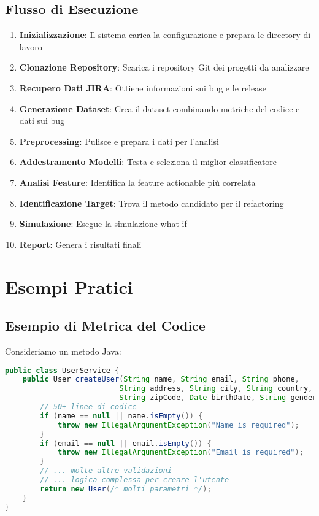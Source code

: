 \documentclass[12pt,a4paper]{article}
\begin{document}
\subsection{Flusso di Esecuzione}

\begin{enumerate}
    \item \textbf{Inizializzazione}: Il sistema carica la configurazione e prepara le directory di lavoro
    \item \textbf{Clonazione Repository}: Scarica i repository Git dei progetti da analizzare
    \item \textbf{Recupero Dati JIRA}: Ottiene informazioni sui bug e le release
    \item \textbf{Generazione Dataset}: Crea il dataset combinando metriche del codice e dati sui bug
    \item \textbf{Preprocessing}: Pulisce e prepara i dati per l'analisi
    \item \textbf{Addestramento Modelli}: Testa e seleziona il miglior classificatore
    \item \textbf{Analisi Feature}: Identifica la feature actionable più correlata
    \item \textbf{Identificazione Target}: Trova il metodo candidato per il refactoring
    \item \textbf{Simulazione}: Esegue la simulazione what-if
    \item \textbf{Report}: Genera i risultati finali
\end{enumerate}

\section{Esempi Pratici}

\subsection{Esempio di Metrica del Codice}

Consideriamo un metodo Java:

\begin{lstlisting}[language=Java, caption=Esempio di metodo con code smells]
public class UserService {
    public User createUser(String name, String email, String phone, 
                          String address, String city, String country, 
                          String zipCode, Date birthDate, String gender) {
        // 50+ linee di codice
        if (name == null || name.isEmpty()) {
            throw new IllegalArgumentException("Name is required");
        }
        if (email == null || email.isEmpty()) {
            throw new IllegalArgumentException("Email is required");
        }
        // ... molte altre validazioni
        // ... logica complessa per creare l'utente
        return new User(/* molti parametri */);
    }
}
\end{lstlisting}
\end{document}

